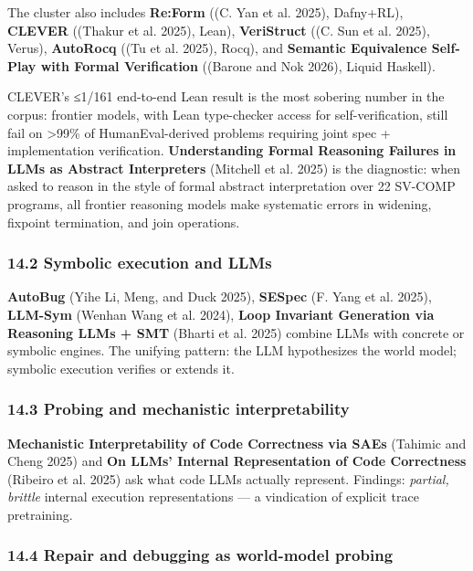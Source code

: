 \documentclass{article}
\begin{document}
The cluster also includes \textbf{Re:Form} ((C. Yan et al. 2025),
Dafny+RL), \textbf{CLEVER} ((Thakur et al. 2025), Lean),
\textbf{VeriStruct} ((C. Sun et al. 2025), Verus), \textbf{AutoRocq}
((Tu et al. 2025), Rocq), and \textbf{Semantic Equivalence Self-Play
with Formal Verification} ((Barone and Nok 2026), Liquid Haskell).

CLEVER's ≤1/161 end-to-end Lean result is the most sobering number in
the corpus: frontier models, with Lean type-checker access for
self-verification, still fail on \textgreater99\% of HumanEval-derived
problems requiring joint spec + implementation verification.
\textbf{Understanding Formal Reasoning Failures in LLMs as Abstract
Interpreters} (Mitchell et al. 2025) is the diagnostic: when asked to
reason in the style of formal abstract interpretation over 22 SV-COMP
programs, all frontier reasoning models make systematic errors in
widening, fixpoint termination, and join operations.

\hypertarget{symbolic-execution-and-llms}{%
\subsubsection{14.2 Symbolic execution and
LLMs}\label{symbolic-execution-and-llms}}

\textbf{AutoBug} (Yihe Li, Meng, and Duck 2025), \textbf{SESpec} (F.
Yang et al. 2025), \textbf{LLM-Sym} (Wenhan Wang et al. 2024),
\textbf{Loop Invariant Generation via Reasoning LLMs + SMT} (Bharti et
al. 2025) combine LLMs with concrete or symbolic engines. The unifying
pattern: the LLM hypothesizes the world model; symbolic execution
verifies or extends it.

\hypertarget{probing-and-mechanistic-interpretability}{%
\subsubsection{14.3 Probing and mechanistic
interpretability}\label{probing-and-mechanistic-interpretability}}

\textbf{Mechanistic Interpretability of Code Correctness via SAEs}
(Tahimic and Cheng 2025) and \textbf{On LLMs' Internal Representation of
Code Correctness} (Ribeiro et al. 2025) ask what code LLMs actually
represent. Findings: \emph{partial, brittle} internal execution
representations --- a vindication of explicit trace pretraining.

\hypertarget{repair-and-debugging-as-world-model-probing}{%
\subsubsection{14.4 Repair and debugging as world-model
probing}\label{repair-and-debugging-as-world-model-probing}}
\end{document}
